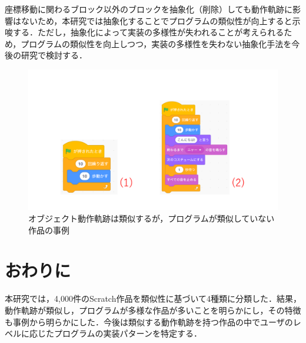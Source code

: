 \documentclass[T,J]{fose} %
\newcommand{\todo}[1]{\colorbox{yellow}{{\bf TODO}:}{\color{red} {\textbf{[#1]}}}}
\begin{document}

座標移動に関わるブロック以外のブロックを抽象化（削除）しても動作軌跡に影響はないため，本研究では抽象化することでプログラムの類似性が向上すると示唆する．ただし，抽象化によって実装の多様性が失われることが考えられるため，プログラムの類似性を向上しつつ，実装の多様性を失わない抽象化手法を今後の研究で検討する．

\begin{figure}[t]
	\centering
	\includegraphics[width=1.0\linewidth]{Okamoto_fig/pattern2-1.pdf}
	\caption{オブジェクト動作軌跡は類似するが，プログラムが類似していない作品の事例}
   \vspace{-2mm}
	\label{fig:pattern2-1}
\end{figure}



\vspace{-5pt}
\section{おわりに}\label{sec:con}

本研究では，4,000件のScratch作品を類似性に基づいて4種類に分類した．結果，動作軌跡が類似し，プログラムが多様な作品が多いことを明らかにし，その特徴も事例から明らかにした．今後は類似する動作軌跡を持つ作品の中でユーザのレベルに応じたプログラムの実装パターンを特定する．





\end{document}
